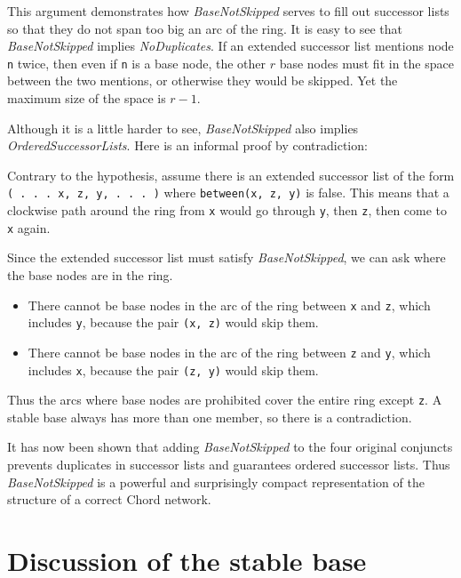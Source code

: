 \documentclass[conference]{IEEEtran}
\begin{document}
This argument demonstrates how {\it BaseNotSkipped} serves to fill out
successor lists so that they do not span too big an arc of the ring.
It is easy to see that {\it BaseNotSkipped} implies
{\it NoDuplicates}.
If an extended successor list mentions node 
\small
{\tt n}
\normalsize
twice, then even if
\small
{\tt n}
\normalsize
is a base node, the other $r$ base nodes must fit in the space between
the two mentions, or otherwise they would be skipped.
Yet the maximum size of the space is $r - 1$.

Although it is a little harder to see, {\it BaseNotSkipped}
also implies {\it OrderedSuccessorLists}.
Here is an informal
proof by contradiction:

Contrary to the hypothesis, assume there is an extended successor
list of the form
\small
{\tt ( . . . x, z, y, . . . )}
\normalsize
where 
\small
{\tt between(x, z, y)}
\normalsize
is false.
This means that a clockwise path around the ring from
\small
{\tt x}
\normalsize
would go through 
\small
{\tt y},
\normalsize
then
\small
{\tt z},
\normalsize
then come to
\small
{\tt x}
\normalsize
again.

Since the extended successor list must satisfy {\it BaseNotSkipped},
we can ask where the base nodes are in the ring.
\begin{itemize}
\item
There cannot be base nodes in the arc of the ring between
\small
{\tt x}
\normalsize
and 
\small
{\tt z},
\normalsize
which includes
\small
{\tt y},
\normalsize
because the pair
\small
{\tt (x, z)}
\normalsize
would skip them.
\item
There cannot be base nodes in the arc of the ring between
\small
{\tt z}
\normalsize
and
\small
{\tt y},
\normalsize
which includes
\small
{\tt x},
\normalsize
because the pair
\small
{\tt (z, y)}
\normalsize
would skip them.
\end{itemize}
Thus the arcs where base nodes are prohibited cover the entire ring
except
\small
{\tt z}.
\normalsize
A stable base always has more than one member, so there is a contradiction.

It has now been shown that
adding {\it BaseNotSkipped}
to the four original conjuncts
prevents duplicates in successor lists and guarantees ordered
successor lists.
Thus {\it BaseNotSkipped} is a powerful and surprisingly
compact representation
of the structure of a correct Chord network.

\section{Discussion of the stable base}
\label{sec:stable}
\end{document}
